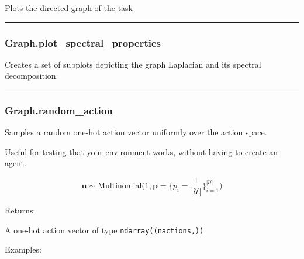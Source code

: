 Plots the directed graph of the task

\begin{center}\rule{0.5\linewidth}{\linethickness}\end{center}

\subsubsection{Graph.plot\_spectral\_properties}\label{graph.plot_spectral_properties}

\begin{Shaded}
\begin{Highlighting}[]
\OperatorTok{=}\OperatorTok{=}\OperatorTok{=}\NormalTok{)}
\end{Highlighting}
\end{Shaded}

Creates a set of subplots depicting the graph Laplacian and its spectral
decomposition.

\begin{center}\rule{0.5\linewidth}{\linethickness}\end{center}

\subsubsection{Graph.random\_action}\label{graph.random_action}

\begin{Shaded}
\begin{Highlighting}[]
\NormalTok{)}
\end{Highlighting}
\end{Shaded}

Samples a random one-hot action vector uniformly over the action space.

Useful for testing that your environment works, without having to create
an agent.

\[
\mathbf u \sim \mathrm{Multinomial}\Big(1, \mathbf p=\{p_i = \frac{1}{|\mathcal U|}\}_{i=1}^{|\mathcal U|}\Big)
\]

Returns:

A one-hot action vector of type \texttt{ndarray((nactions,))}

Examples:

\begin{Shaded}
\begin{Highlighting}[]
\OperatorTok{=}
\end{Highlighting}
\end{Shaded}


